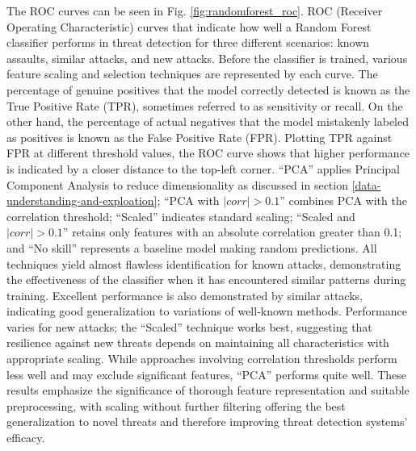 The ROC curves can be seen in Fig. \ref{fig:randomforest_roc}. ROC (Receiver Operating Characteristic) curves that indicate how well a Random Forest classifier performs in threat detection for three different scenarios: known assaults, similar attacks, and new attacks. Before the classifier is trained, various feature scaling and selection techniques are represented by each curve. The percentage of genuine positives that the model correctly detected is known as the True Positive Rate (TPR), sometimes referred to as sensitivity or recall. On the other hand, the percentage of actual negatives that the model mistakenly labeled as positives is known as the False Positive Rate (FPR). Plotting TPR against FPR at different threshold values, the ROC curve shows that higher performance is indicated by a closer distance to the top-left corner. ``PCA'' applies Principal Component Analysis to reduce dimensionality as discussed in section \ref{data-understanding-and-exploation}; ``PCA with $|corr|> 0.1$'' combines PCA with the correlation threshold; ``Scaled'' indicates standard scaling; ``Scaled and $|corr| > 0.1$'' retains only features with an absolute correlation greater than 0.1; and ``No skill'' represents a baseline model making random predictions. All techniques yield almost flawless identification for known attacks, demonstrating the effectiveness of the classifier when it has encountered similar patterns during training. Excellent performance is also demonstrated by similar attacks, indicating good generalization to variations of well-known methods. Performance varies for new attacks; the ``Scaled'' technique works best, suggesting that resilience against new threats depends on maintaining all characteristics with appropriate scaling. While approaches involving correlation thresholds perform less well and may exclude significant features, ``PCA'' performs quite well. These results emphasize the significance of thorough feature representation and suitable preprocessing, with scaling without further filtering offering the best generalization to novel threats and therefore improving threat detection systems' efficacy.

